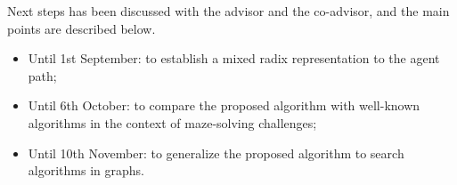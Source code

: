 Next steps has been discussed with the advisor and the co-advisor, and the main points are described below.

\begin{itemize}
\item Until 1st September: to establish a mixed radix representation to the agent path;
\item Until 6th October: to compare the proposed algorithm with well-known algorithms in the context of maze-solving challenges;
\item Until 10th November: to generalize the proposed algorithm to search algorithms in graphs.
\end{itemize}